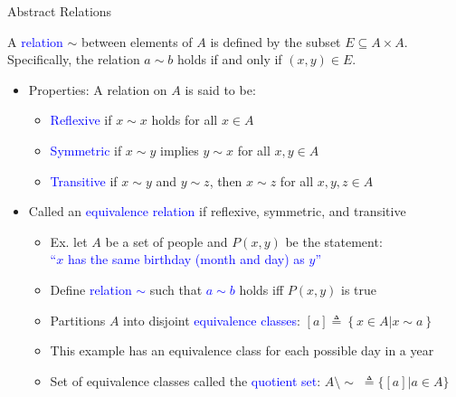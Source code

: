 \documentclass[10pt,english]{beamer}
\begin{document}
\begin{frame}{Abstract Relations}

\vspace{3mm}
\begin{definition}
A \textcolor{blue}{relation} $\sim$ between elements of $A$ is defined by the subset $E \subseteq A\times A$.  Specifically, the relation $a \sim b$ holds if and only if $(x,y)\in E$.
\end{definition}
\vspace{-5mm}

\begin{itemize}
\setlength\itemsep{3mm}
\item<1-> Properties: A relation on $A$ is said to be: \vspace{1mm}
\begin{itemize}
  \setlength\itemsep{1.5mm}
  \item \textcolor{blue}{Reflexive} if $x\sim x$ holds for all $x\in A$
  \item \textcolor{blue}{Symmetric} if $x\sim y$ implies $y\sim x$ for all $x,y\in A$
  \item \textcolor{blue}{Transitive} if $x\sim y$ and $y\sim z$, then $x\sim z$ for all $x,y,z\in A$
\end{itemize}

\item<2-> Called an \textcolor{blue}{equivalence relation} if reflexive, symmetric, and transitive \vspace{1mm}

\begin{itemize}
  \setlength\itemsep{1.5mm}
  \item Ex. let $A$ be a set of people and $P(x,y)$ be the statement: \\ \textcolor{blue}{``$x$ has the same birthday (month and day) as $y$''}
  \item Define \textcolor{blue}{relation $\sim$} such that \textcolor{blue}{$a\sim b$} holds iff $P(x,y)$ is true
  \item Partitions $A$ into disjoint \textcolor{blue}{equivalence classes}: $[a] \triangleq \left\{x\in A | x \sim a\right\}$
  \item This example has an equivalence class for each possible day in a year
  \item Set of equivalence classes called the \textcolor{blue}{quotient set}: $A \setminus \!\sim \;\triangleq \{ [a] | a\in A \}$

\end{itemize}
\end{itemize}
\end{frame}
\end{document}
